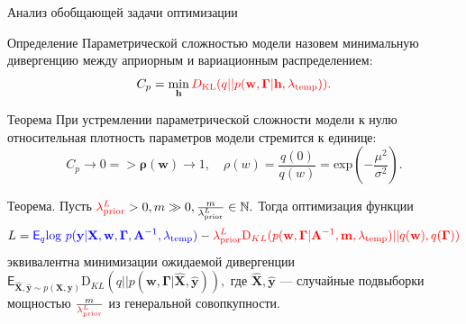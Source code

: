\documentclass[usenames,dvipsnames,11pt,pdf,utf8,russian,aspectratio=43]{beamer}
\begin{document}
\begin{frame}{Анализ обобщающей задачи оптимизации}
\footnotesize
\begin{block}{Определение}
Параметрической сложностью модели назовем минимальную дивергенцию между априорным и вариационным распределением:
\vspace{-0.2cm}
\[
    C_p = \min_{\mathbf{h}} \textcolor{red}{D_\text{KL}(q||p(\mathbf{w}, \boldsymbol{\Gamma}|\mathbf{h},\lambda_\text{temp})).}
\]
\end{block}

\begin{block}{Теорема}
При устремлении параметрической сложности модели к нулю относительная плотность параметров модели стремится к единице:
\vspace{-0.3cm}
\[
    C_p \to 0 => \boldsymbol{\rho}(\mathbf{w}) \to 1, \quad \rho(w) = \frac{q(0)}{q(w)} = \text{exp}\left(-\frac{\mu^2}{\sigma^2}\right).
\]
\end{block}



\begin{block}{Теорема.}
Пусть $\textcolor{red}{\lambda_\text{prior}^L} > 0, m \gg 0, \frac{m}{\lambda_\text{prior}^L} \in \mathbb{N}.$ Тогда оптимизация функции\vspace{-0.3cm} \[L = 
\textcolor{blue}{\mathsf{E}_q \text{log}~{p(\mathbf{y} | \mathbf{X}, \mathbf{w}, \boldsymbol{\Gamma}, \mathbf{A}^{-1}, \lambda_{\text{temp}})}} - \textcolor{red}{\lambda_\text{prior}^L\text{D}_{KL}(p(\mathbf{w}, \boldsymbol{\Gamma} |\mathbf{A}^{-1}, \mathbf{m}, \lambda_{\text{temp}}) || q(\mathbf{w}), q(\boldsymbol{\Gamma}))}\vspace{-0.2cm}\] эквивалентна минимизации ожидаемой дивергенции $\mathsf{E}_{\hat{\mathbf{X}}, \hat{\mathbf{y}}\sim p(\mathbf{X}, \mathbf{y})}\text{D}_{KL}(q||p(\mathbf{w}, \boldsymbol{\Gamma} | \hat{\mathbf{X}}, \hat{\mathbf{y}})),$ где $\hat{\mathbf{X}}, \hat{\mathbf{y}}$ --- случайные подвыборки мощностью $\frac{m}{\textcolor{red}{\lambda_\text{prior}^L}}$ из генеральной совопкупности.
\end{block}


\end{frame}
\end{document}
